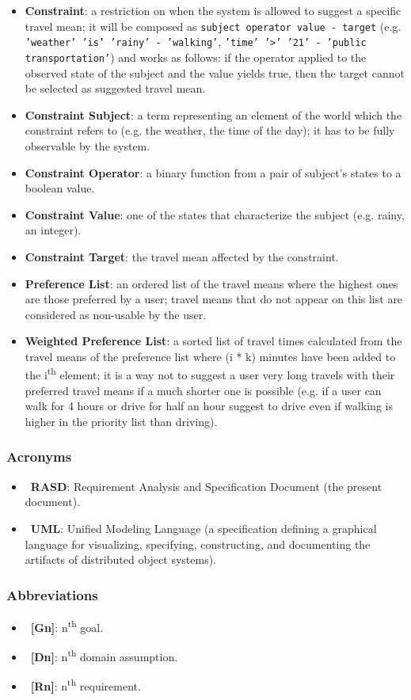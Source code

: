 \begin{itemize}
\item \textbf{Constraint}: a restriction on when the system is allowed to suggest a specific travel mean; it will be composed as \texttt{subject operator value - target} (e.g. \texttt{'weather' 'is' 'rainy' - 'walking'}, \texttt{'time' '>' '21' - 'public transportation'}) and works as follows: if the operator applied to the observed state of the subject and the value yields true, then the target cannot be selected as suggested travel mean.
\item \textbf{Constraint Subject}: a term representing an element of the world which the constraint refers to (e.g. the weather, the time of the day); it has to be fully observable by the system.
\item \textbf{Constraint Operator}: a binary function from a pair of subject's states to a boolean value.
\item \textbf{Constraint Value}: one of the states that characterize the subject (e.g. rainy, an integer).
\item \textbf{Constraint Target}: the travel mean affected by the constraint.

\item \textbf{Preference List}: an ordered list of the travel means where the highest ones are those preferred by a user; travel means that do not appear on this list are considered as non-usable by the user.
\item \textbf{Weighted Preference List}: a sorted list of travel times calculated from the travel means of the preference list where (i * k) minutes have been added to the i\textsuperscript{th} element; it is a way not to suggest a user very long travels with their preferred travel means if a much shorter one is possible (e.g. if a user can walk for 4 hours or drive for half an hour suggest to drive even if walking is higher in the priority list than driving).
\end{itemize}

\subsubsection{Acronyms}

\begin{itemize}
\item~\textbf{RASD}: Requirement Analysis and Specification Document (the present document).
\item~\textbf{UML}: Unified Modeling Language (a specification defining a graphical language for visualizing, specifying, constructing, and documenting the artifacts of distributed object systems).

\end{itemize}

\subsubsection{Abbreviations}

\begin{itemize}
\item~\textbf{[Gn]}: n\textsuperscript{th} goal.
\item~\textbf{[Dn]}: n\textsuperscript{th} domain assumption.
\item~\textbf{[Rn]}: n\textsuperscript{th} requirement.
\end{itemize}
